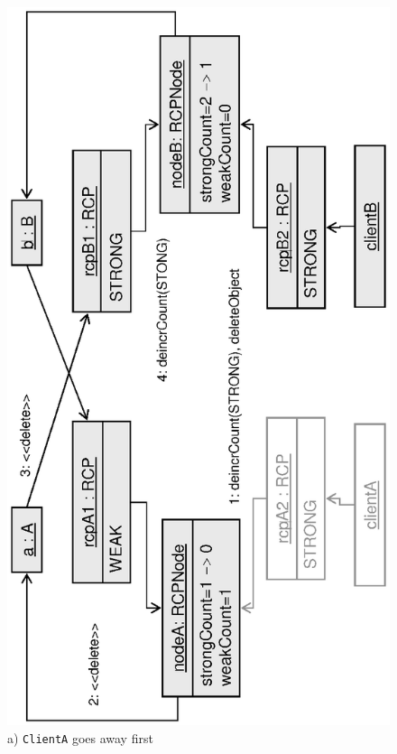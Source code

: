 \documentclass[pdf,ps2pdf,11pt]{SANDreport}
\begin{document}
{\bsinglespace
\begin{figure}
\begin{center}
\includegraphics*[angle=270,scale=0.65]{CircularRCP_A_B_ClientA_1}
\\[2ex] a) {}\texttt{ClientA} goes away first \\[3ex]

\end{center}
\end{figure}}
\end{document}
